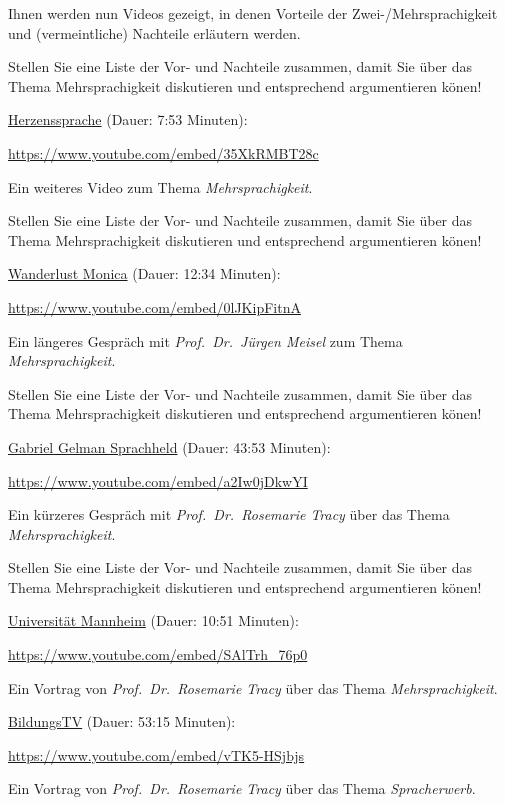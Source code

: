 \documentclass[
  letterpaper,
]{scrbook}
\begin{document}
Ihnen werden nun Videos gezeigt, in denen Vorteile der
Zwei-/Mehrsprachigkeit und (vermeintliche) Nachteile erläutern werden.

Stellen Sie eine Liste der Vor- und Nachteile zusammen, damit Sie über
das Thema Mehrsprachigkeit diskutieren und entsprechend argumentieren
könen!

\href{https://www.youtube.com/watch?v=35XkRMBT28c}{Herzenssprache}
(Dauer: 7:53 Minuten):

\url{https://www.youtube.com/embed/35XkRMBT28c}

Ein weiteres Video zum Thema \emph{Mehrsprachigkeit}.

Stellen Sie eine Liste der Vor- und Nachteile zusammen, damit Sie über
das Thema Mehrsprachigkeit diskutieren und entsprechend argumentieren
könen!

\href{https://www.youtube.com/watch?v=0lJKipFitnA}{Wanderlust Monica}
(Dauer: 12:34 Minuten):

\url{https://www.youtube.com/embed/0lJKipFitnA}

Ein längeres Gespräch mit \emph{Prof.~Dr.~Jürgen Meisel} zum Thema
\emph{Mehrsprachigkeit}.

Stellen Sie eine Liste der Vor- und Nachteile zusammen, damit Sie über
das Thema Mehrsprachigkeit diskutieren und entsprechend argumentieren
könen!

\href{https://www.youtube.com/watch?v=a2Iw0jDkwYI}{Gabriel Gelman
Sprachheld} (Dauer: 43:53 Minuten):

\url{https://www.youtube.com/embed/a2Iw0jDkwYI}

Ein kürzeres Gespräch mit \emph{Prof.~Dr.~Rosemarie Tracy} über das
Thema \emph{Mehrsprachigkeit}.

Stellen Sie eine Liste der Vor- und Nachteile zusammen, damit Sie über
das Thema Mehrsprachigkeit diskutieren und entsprechend argumentieren
könen!

\href{https://www.youtube.com/watch?v=SAlTrh_76p0}{Universität Mannheim}
(Dauer: 10:51 Minuten):

\url{https://www.youtube.com/embed/SAlTrh_76p0}

Ein Vortrag von \emph{Prof.~Dr.~Rosemarie Tracy} über das Thema
\emph{Mehrsprachigkeit}.

\href{https://www.youtube.com/watch?v=vTK5-HSjbjs}{BildungsTV} (Dauer:
53:15 Minuten):

\url{https://www.youtube.com/embed/vTK5-HSjbjs}

Ein Vortrag von \emph{Prof.~Dr.~Rosemarie Tracy} über das Thema
\emph{Spracherwerb}.
\end{document}
